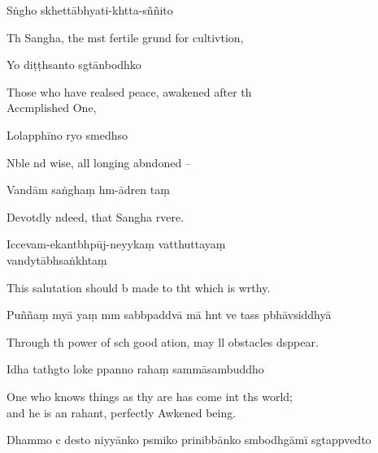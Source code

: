 Sṅgho skhettābhyati-khtta-sññito

\begin{english}
  Th Sangha, the mst fertile grund for cultivtion,
\end{english}

Yo diṭṭhsanto sgtānbodhko

\begin{english}
  Those who have realsed peace, awakened after th \\Acc{}mplished One,
\end{english}

Lolapphīno ryo smedhso

\begin{english}
  Nble nd wise, all longing abndoned --
\end{english}

Vandām saṅghaṃ hm-ādren taṃ

\begin{english}
  Devotdly ndeed, that Sangha  rvere.
\end{english}

Iccevam-ekantbhpūj-neyykaṃ vatthuttayaṃ \\vand{}ytābhsaṅkhtaṃ

\begin{english}
  This salutation should b made to tht which is wrthy.
\end{english}

Puññaṃ myā yaṃ mm sabbpaddvā mā hnt ve tass pbhāvsiddhyā

\begin{english}
  Through th power of sch good ation, may ll obstacles dsppear.
\end{english}

Idha tathgto loke ppanno rahaṃ sammāsambuddho

\begin{english}
  One who knows things as thy are has come int ths world; \\and he is an rahant,  perfectly Awkened being.
\end{english}

Dhammo c desto niyyānko psmiko prinibbānko smbodhgāmī sgtappvedto

